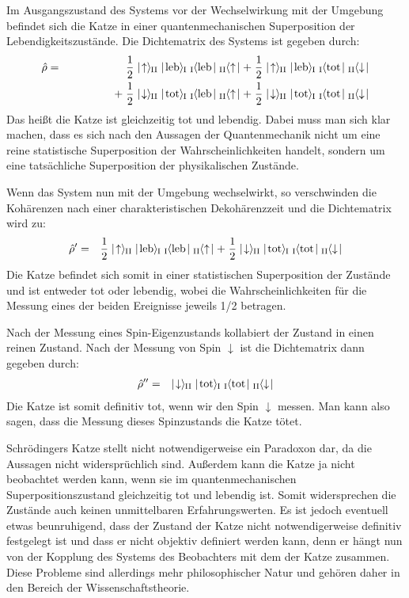 \begin{itemize1}
	\item Im Ausgangszustand des Systems vor der Wechselwirkung mit der Umgebung befindet sich die Katze in einer quantenmechanischen Superposition der Lebendigkeitszustände. Die Dichtematrix des Systems ist gegeben durch: 
	\begin{eqnarray*}
		\hat{\rho} &=& \frac12 \ketII{\uparrow}\ketI{\text{leb}}\;\braI{\text{leb}}\braII{\uparrow} + \;\frac12 \ketII{\uparrow}\ketI{\text{leb}}\;\braI{\text{tot}}\braII{\downarrow} 
		\\
		&&\qquad\qquad +\;\frac12 \ketII{\downarrow}\ketI{\text{tot}}\;\braI{\text{leb}}\braII{\uparrow} + \;\frac12 \ketII{\downarrow}\ketI{\text{tot}}\;\braI{\text{tot}}\braII{\downarrow}
	\end{eqnarray*}
	Das heißt die Katze ist gleichzeitig tot und lebendig. Dabei muss man sich klar machen, dass es sich nach den Aussagen der Quantenmechanik nicht um eine reine statistische Superposition der Wahrscheinlichkeiten handelt, sondern um eine tatsächliche Superposition der physikalischen Zustände. 
	\item Wenn das System nun mit der Umgebung wechselwirkt, so verschwinden die Kohärenzen nach einer charakteristischen Dekohärenzzeit und die Dichtematrix wird zu: 
	\begin{eqnarray*} 
		\hat{\rho}' &=& \frac12 \ketII{\uparrow}\ketI{\text{leb}}\;\braI{\text{leb}}\braII{\uparrow} + \;\frac12 \ketII{\downarrow}\ketI{\text{tot}}\;\braI{\text{tot}}\braII{\downarrow}
	\end{eqnarray*}
	Die Katze befindet sich somit in einer statistischen Superposition der Zustände und ist entweder tot oder lebendig, wobei die Wahrscheinlichkeiten für die Messung eines der beiden Ereignisse jeweils 1/2 betragen. 
	\item Nach der Messung eines Spin-Eigenzustands kollabiert der Zustand in einen reinen Zustand. Nach der Messung von Spin $\downarrow$ ist die Dichtematrix dann gegeben durch: 
	\begin{eqnarray*}
		\hat{\rho}'' &=& \ketII{\downarrow}\ketI{\text{tot}}\;\braI{\text{tot}}\braII{\downarrow}
	\end{eqnarray*}
	Die Katze ist somit definitiv tot, wenn wir den Spin $\downarrow$ messen. Man kann also sagen, dass die Messung dieses Spinzustands die Katze tötet. 
\end{itemize1}
Schrödingers Katze stellt nicht notwendigerweise ein Paradoxon dar, da die Aussagen nicht widersprüchlich sind. Außerdem kann die Katze ja nicht beobachtet werden kann, wenn sie im quantenmechanischen Superpositionszustand gleichzeitig tot und lebendig ist. Somit widersprechen die Zustände auch keinen unmittelbaren Erfahrungswerten. Es ist jedoch eventuell etwas beunruhigend, dass der Zustand der Katze nicht notwendigerweise definitiv festgelegt ist und dass er nicht objektiv definiert werden kann, denn er hängt nun von der Kopplung des Systems des Beobachters mit dem der Katze zusammen. Diese Probleme sind allerdings mehr philosophischer Natur und gehören daher in den Bereich der Wissenschaftstheorie. 


